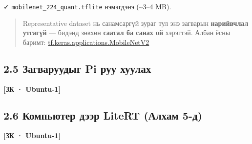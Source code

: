 ✓ \texttt{mobilenet\_\allowbreak{}224\_\allowbreak{}quant.\allowbreak{}tflite} нэмэгдэнэ (\textasciitilde3--4 MB).

\begin{quote}
Representative dataset нь санамсаргүй зураг тул энэ загварын \textbf{нарийвчлал утгагүй} --- бидэнд зөвхөн \textbf{саатал ба санах ой} хэрэгтэй. Албан ёсны баримт: \href{https://www.tensorflow.org/api_docs/python/tf/keras/applications/MobileNetV2}{tf.\allowbreak{}keras.\allowbreak{}applications.\allowbreak{}MobileNetV2}
\end{quote}

\hypertarget{ux437ux430ux433ux432ux430ux440ux443ux443ux434ux44bux433-pi-ux440ux443ux443-ux445ux443ux443ux43bux430ux445}{%
\subsection{2.5 Загваруудыг Pi руу хуулах}\label{ux437ux430ux433ux432ux430ux440ux443ux443ux434ux44bux433-pi-ux440ux443ux443-ux445ux443ux443ux43bux430ux445}}

\textbf{{[}ЗК · Ubuntu-1{]}}

\begin{Shaded}
\begin{Highlighting}[]
\OperatorTok{\textless{}}\OperatorTok{\textgreater{}}
\end{Highlighting}
\end{Shaded}

\hypertarget{ux43aux43eux43cux43fux44cux44eux442ux435ux440-ux434ux44dux44dux440-litert-ux430ux43bux445ux430ux43c-5-ux434}{%
\subsection{2.6 Компьютер дээр LiteRT (Алхам 5-д)}\label{ux43aux43eux43cux43fux44cux44eux442ux435ux440-ux434ux44dux44dux440-litert-ux430ux43bux445ux430ux43c-5-ux434}}

\textbf{{[}ЗК · Ubuntu-1{]}}

\begin{Shaded}
\begin{Highlighting}[]
\end{Highlighting}
\end{Shaded}


